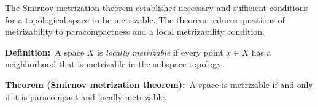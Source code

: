 \documentclass[12pt]{article}
\begin{document}
The Smirnov metrization theorem establishes necessary and sufficient conditions for a topological space to be metrizable. The theorem reduces questions of metrizability to paracompactness and a local metrizability condition.

\textbf{Definition:}\ A space $X$ is \emph{locally metrizable} if every point $x\in X$ has a neighborhood that is metrizable in the subspace topology.

\textbf{Theorem (Smirnov metrization theorem):}\ A space is metrizable if and only if it is paracompact and locally metrizable.
\end{document}
